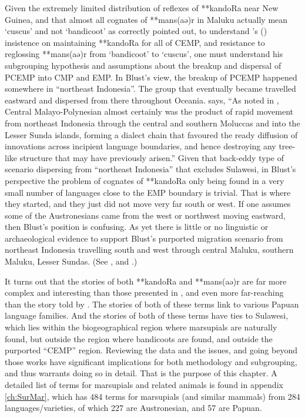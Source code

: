 Given the extremely limited distribution of reflexes of **kandoRa
near New Guinea, and that almost all cognates of **mans(aə)r in Maluku actually
mean ‘cuscus’ and not ‘bandicoot’ as \citet{Schapper2011} correctly pointed
out, to understand \citeauthor{Blust2012b}'s (\citeyear{Blust2012b}) insistence on maintaining **kandoRa
for all of CEMP,
and resistance to reglossing **mans(aə)r from ‘bandicoot’ to
‘cuscus’, one must understand his subgrouping hypothesis
and assumptions about the breakup
and dispersal of PCEMP into CMP and EMP.
In Blust's view, the breakup of PCEMP happened somewhere in “northeast Indonesia”.
The group that eventually became  travelled eastward
and dispersed from there throughout Oceania.
\citet[98]{Blust2008} says, “As noted in \citet{Blust1993},
Central Malayo-Polynesian almost certainly was the product of
rapid movement from northeast Indonesia through the central
and southern Moluccas and into the Lesser Sunda islands,
forming a dialect chain that favoured the ready diffusion of
innovations across incipient language boundaries,
and hence destroying any tree-like structure that may have previously
arisen.” 
Given that back-eddy type of scenario dispersing from ``northeast
Indonesia'' that excludes Sulawesi,
in Blust's perspective the problem of cognates of **kandoRa only
being found in a very small number of languages close to the
EMP boundary is trivial.
That is where they started,
and they just did not move very far south or west.
If one assumes some of the Austronesians came from the west or
northwest moving eastward, then Blust's position is confusing.
As yet there is little or no linguistic or archaeological evidence
to support Blust’s purported migration scenario from northeast
Indonesia travelling south and west through central Maluku,
southern Maluku, Lesser Sundas.
(See , and \citealp[4]{Bellwood2019b}.)

It turns out that the stories of both **kandoRa
and **mans(aə)r are far more complex
and interesting than those presented in \citet{Blust1982,Blust2012b},
and even more far-reaching than the story told by \citet{Schapper2011}.
The stories of both of these terms link to various Papuan language families.
And the stories of both of these terms have ties to Sulawesi,
which lies within the biogeographical region where marsupials
are naturally found, but outside the region where bandicoots are found,
and outside the purported “CEMP” region.
Reviewing the data and the issues, and going beyond those works
have significant implications for both methodology
and subgrouping, and thus warrants doing so in detail.
That is the purpose of this chapter.
A detailed list of terms for marsupials
and related animals is found in appendix \ref{ch:SurMar},
which has 484 terms for marsupials
(and similar mammals) from 284 languages/varieties,
of which 227 are Austronesian,
and 57 are Papuan.

